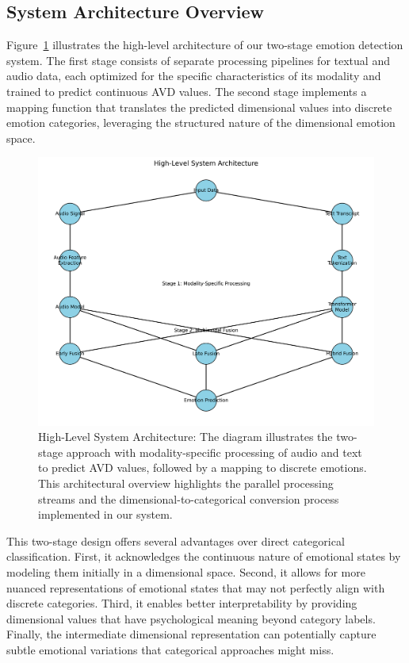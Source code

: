 \documentclass[12pt]{article}
\begin{document}
\subsection{System Architecture Overview}
Figure~\ref{fig:system_architecture} illustrates the high-level architecture of our two-stage emotion detection system. The first stage consists of separate processing pipelines for textual and audio data, each optimized for the specific characteristics of its modality and trained to predict continuous AVD values. The second stage implements a mapping function that translates the predicted dimensional values into discrete emotion categories, leveraging the structured nature of the dimensional emotion space.

\begin{figure}[h]
    \centering
    \includegraphics[width=0.9\linewidth]{Figures_Improved/system_architecture_fixed_improved.png}
    \caption{High-Level System Architecture: The diagram illustrates the two-stage approach with modality-specific processing of audio and text to predict AVD values, followed by a mapping to discrete emotions. This architectural overview highlights the parallel processing streams and the dimensional-to-categorical conversion process implemented in our system.}
    \label{fig:system_architecture}
\end{figure}

This two-stage design offers several advantages over direct categorical classification. First, it acknowledges the continuous nature of emotional states by modeling them initially in a dimensional space. Second, it allows for more nuanced representations of emotional states that may not perfectly align with discrete categories. Third, it enables better interpretability by providing dimensional values that have psychological meaning beyond category labels. Finally, the intermediate dimensional representation can potentially capture subtle emotional variations that categorical approaches might miss.
\end{document}
